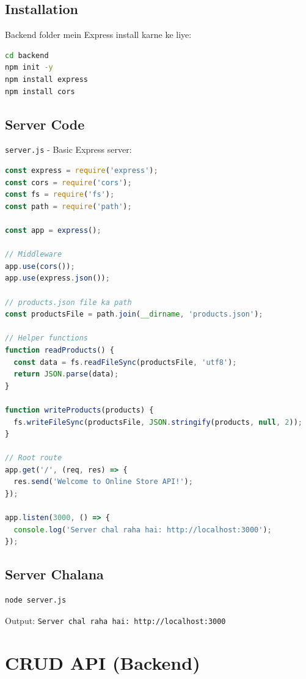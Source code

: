 \documentclass[12pt,a4paper]{article}
\begin{document}
\subsection{Installation}
Backend folder mein Express install karne ke liye:

\begin{lstlisting}[language=bash, caption={Express Installation}]
cd backend
npm init -y
npm install express
npm install cors
\end{lstlisting}

\subsection{Server Code}
\texttt{server.js} - Basic Express server:

\begin{lstlisting}[language=JavaScript, caption={server.js - Express Server}]
const express = require('express');
const cors = require('cors');
const fs = require('fs');
const path = require('path');

const app = express();

// Middleware
app.use(cors());
app.use(express.json());

// products.json file ka path
const productsFile = path.join(__dirname, 'products.json');

// Helper functions
function readProducts() {
  const data = fs.readFileSync(productsFile, 'utf8');
  return JSON.parse(data);
}

function writeProducts(products) {
  fs.writeFileSync(productsFile, JSON.stringify(products, null, 2));
}

// Root route
app.get('/', (req, res) => {
  res.send('Welcome to Online Store API!');
});

app.listen(3000, () => {
  console.log('Server chal raha hai: http://localhost:3000');
});
\end{lstlisting}

\subsection{Server Chalana}
\begin{lstlisting}[language=bash, caption={Server Start}]
node server.js
\end{lstlisting}

Output: \texttt{Server chal raha hai: http://localhost:3000}

\section{CRUD API (Backend)}
\label{sec:crud}
\end{document}
